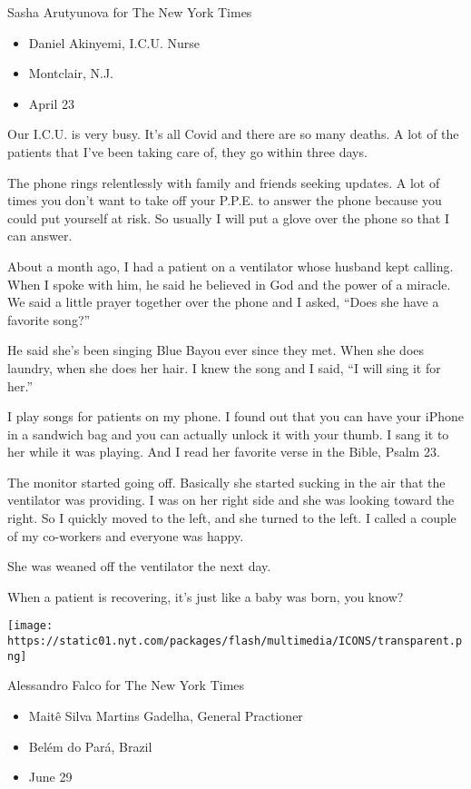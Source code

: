 Sasha Arutyunova for The New York Times

\begin{itemize}
\tightlist
\item
  Daniel Akinyemi, I.C.U. Nurse
\item
  Montclair, N.J.
\item
  April 23
\end{itemize}

Our I.C.U. is very busy. It's all Covid and there are so many deaths. A
lot of the patients that I've been taking care of, they go within three
days.

The phone rings relentlessly with family and friends seeking updates. A
lot of times you don't want to take off your P.P.E. to answer the phone
because you could put yourself at risk. So usually I will put a glove
over the phone so that I can answer.

About a month ago, I had a patient on a ventilator whose husband kept
calling. When I spoke with him, he said he believed in God and the power
of a miracle. We said a little prayer together over the phone and I
asked, ``Does she have a favorite song?''

He said she's been singing Blue Bayou ever since they met. When she does
laundry, when she does her hair. I knew the song and I said, ``I will
sing it for her.''

I play songs for patients on my phone. I found out that you can have
your iPhone in a sandwich bag and you can actually unlock it with your
thumb. I sang it to her while it was playing. And I read her favorite
verse in the Bible, Psalm 23.

The monitor started going off. Basically she started sucking in the air
that the ventilator was providing. I was on her right side and she was
looking toward the right. So I quickly moved to the left, and she turned
to the left. I called a couple of my co-workers and everyone was happy.

She was weaned off the ventilator the next day.

When a patient is recovering, it's just like a baby was born, you know?

\texttt{[image: https://static01.nyt.com/packages/flash/multimedia/ICONS/transparent.png]}

Alessandro Falco for The New York Times

\begin{itemize}
\tightlist
\item
  Maitê Silva Martins Gadelha, General Practioner
\item
  Belém do Pará, Brazil
\item
  June 29
\end{itemize}

